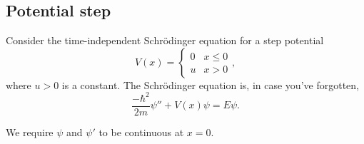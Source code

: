 \documentclass[a4paper]{article}
\begin{document}
\subsection{Potential step}
Consider the time-independent Schr\"odinger equation for a step potential
\[
  V(x) =
  \begin{cases}
    0 & x \leq 0\\
    u & x > 0
  \end{cases},
\]
where $u > 0$ is a constant. The Schr\"odinger equation is, in case you've forgotten,
\[
  \frac{-\hbar^2}{2m}\psi'' + V(x) \psi = E\psi.
\]
\begin{center}
\end{center}
We require $\psi$ and $\psi'$ to be continuous at $x = 0$.
\end{document}
